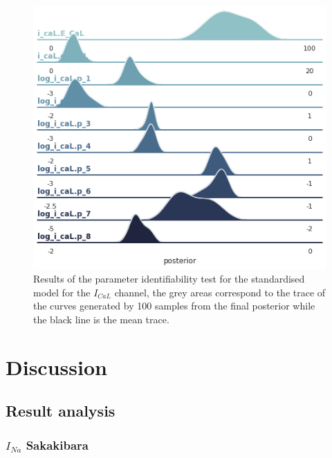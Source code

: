 \documentclass[11pt]{report}
\begin{document}
\begin{figure}[H]
    \centering
    \begin{measuredfigure}
\includegraphics[scale = 0.55 ]{figures/Ica_Simple_Li/ica_simple_post_all_Li_pop_10000.png}
    \captionsetup{singlelinecheck = false, format= hang, justification=centerlast, labelsep=space}
	\caption{Results of the parameter identifiability test for the standardised model for the $I_{CaL}$ channel, the grey areas correspond to the trace of the curves generated by 100 samples from the final posterior while the black line is the mean trace.}
	\end{measuredfigure}
      \addtocounter{figure}{-1}
	\label{fig:IcaParameterIdentifiabilityStandardLi}
\end{figure}

\chapter{Discussion}
\section{Result analysis}

\subsection{$I_{Na}$ Sakakibara \cite{Sakakibara1992}}
\end{document}
